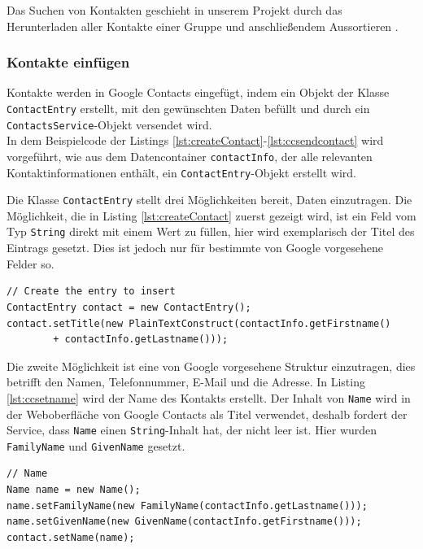 Das Suchen von Kontakten geschieht in unserem Projekt durch das Herunterladen aller Kontakte
 einer Gruppe und anschließendem Aussortieren .

\FloatBarrier
\subsubsection{Kontakte einf\"ugen}
Kontakte werden in Google Contacts eingefügt, indem ein Objekt der Klasse
 \lstinline{ContactEntry} erstellt, mit den gewünschten Daten befüllt und durch ein
 \lstinline{ContactsService}-Objekt versendet wird.\\
In dem Beispielcode der Listings \ref{lst:createContact}-\ref{lst:ccsendcontact} wird
 vorgeführt, wie aus dem Datencontainer \lstinline{contactInfo}, der alle relevanten
  Kontaktinformationen enthält, ein \lstinline{ContactEntry}-Objekt erstellt wird.

Die Klasse \lstinline{ContactEntry} stellt drei Möglichkeiten bereit, Daten einzutragen.
Die Möglichkeit, die in Listing \ref{lst:createContact} zuerst gezeigt wird, ist ein Feld vom Typ
 \lstinline{String} direkt mit einem Wert zu füllen, hier wird exemplarisch der Titel des Eintrags
 gesetzt.
Dies ist jedoch nur für bestimmte von Google vorgesehene Felder so.

\begin{lstlisting}[float=h!t]
// Create the entry to insert
ContactEntry contact = new ContactEntry();
contact.setTitle(new PlainTextConstruct(contactInfo.getFirstname()
		+ contactInfo.getLastname()));
\end{lstlisting}

Die zweite Möglichkeit ist eine von Google vorgesehene Struktur einzutragen, dies betrifft den
 Namen, Telefonnummer, E-Mail und die Adresse.
In Listing \ref{lst:ccsetname} wird der Name des Kontakts erstellt.
Der Inhalt von \lstinline{Name} wird in der Weboberfläche von Google Contacts als Titel verwendet,
 deshalb fordert der Service, dass \lstinline{Name} einen \lstinline{String}-Inhalt hat, der nicht
 leer ist.
Hier wurden \lstinline{FamilyName} und \lstinline{GivenName} gesetzt.

\begin{lstlisting}[float=h!t]
// Name
Name name = new Name();
name.setFamilyName(new FamilyName(contactInfo.getLastname()));
name.setGivenName(new GivenName(contactInfo.getFirstname()));
contact.setName(name);
\end{lstlisting}


